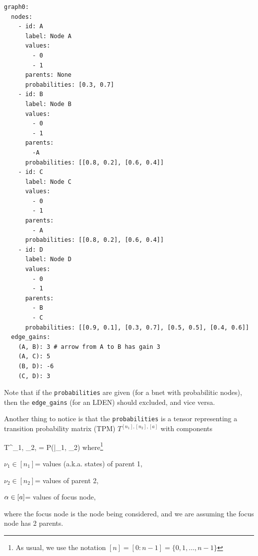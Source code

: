 \begin{mdframed}[hidealllines=true,backgroundcolor=blue!10]
\begin{verbatim}
graph0:
  nodes:
    - id: A
      label: Node A
      values: 
        - 0 
        - 1
      parents: None
      probabilities: [0.3, 0.7]
    - id: B
      label: Node B
      values: 
        - 0 
        - 1
      parents:
        -A
      probabilities: [[0.8, 0.2], [0.6, 0.4]]
    - id: C
      label: Node C
      values:
        - 0
        - 1
      parents: 
        - A   
      probabilities: [[0.8, 0.2], [0.6, 0.4]]
    - id: D
      label: Node D
      values:
        - 0
        - 1
      parents: 
        - B
        - C
      probabilities: [[0.9, 0.1], [0.3, 0.7], [0.5, 0.5], [0.4, 0.6]]
  edge_gains:
    (A, B): 3 # arrow from A to B has gain 3
    (A, C): 5
    (B, D): -6
    (C, D): 3
\end{verbatim}
\end{mdframed}

Note that if the 
{\tt probabilities}
are given (for a bnet with 
probabilitic nodes), then
the {\tt edge\_gains} (for an LDEN) should
excluded, and vice versa.


Another thing to notice
is that the {\tt probabilities} is a tensor
representing a transition probability matrix (TPM)
$T^{[n_1], [n_2], [a]}$
with components

\beq
 T^{\nu_1, \nu_2, \alp}= P(\alp|\nu_1, \nu_2)
 \eeq
where\footnote{As usual, we use the notation $[n]=[0:n-1]=\{0, 1, \ldots, n-1\}$}

$\nu_1\in[n_1]$= values (a.k.a. states) of parent 1,

$\nu_2\in[n_2]$= values of parent 2, 

$\alpha\in[a]$= values of focus node,

where the focus node is the node
being considered, and we are assuming the focus node has 2 parents.
